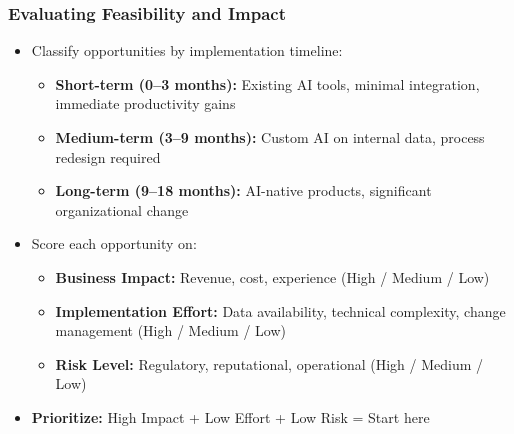 \begin{frame}[fragile]\frametitle{Evaluating Feasibility and Impact}

\begin{itemize}
  \item Classify opportunities by implementation timeline:
    \begin{itemize}
      \item \textbf{Short-term (0--3 months):} Existing AI tools, minimal integration, immediate productivity gains
      \item \textbf{Medium-term (3--9 months):} Custom AI on internal data, process redesign required
      \item \textbf{Long-term (9--18 months):} AI-native products, significant organizational change
    \end{itemize}
  \item Score each opportunity on:
    \begin{itemize}
      \item \textbf{Business Impact:} Revenue, cost, experience (High / Medium / Low)
      \item \textbf{Implementation Effort:} Data availability, technical complexity, change management (High / Medium / Low)
      \item \textbf{Risk Level:} Regulatory, reputational, operational (High / Medium / Low)
    \end{itemize}
  \item \textbf{Prioritize:} High Impact + Low Effort + Low Risk = Start here
\end{itemize}

\end{frame}

